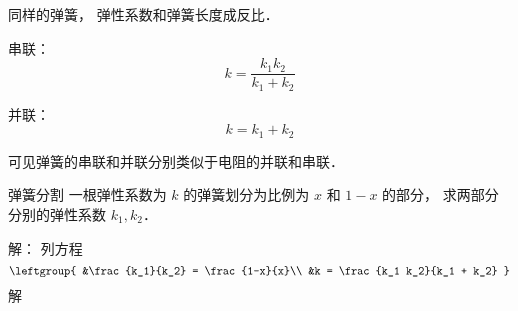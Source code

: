 
\begin{issues}
\issueDraft
\end{issues}

同样的弹簧， 弹性系数和弹簧长度成反比．

串联：
\begin{equation}
k = \frac{k_1 k_2}{k_1 + k_2}
\end{equation}

并联：
\begin{equation}
k = k_1 + k_2
\end{equation}

可见弹簧的串联和并联分别类似于电阻的并联和串联．


\begin{example}{弹簧分割}
一根弹性系数为 $k$ 的弹簧划分为比例为 $x$ 和 $1-x$ 的部分， 求两部分分别的弹性系数 $k_1, k_2$．

解： 列方程
\begin{equation}
\leftgroup{
&\frac{k_1}{k_2} = \frac{1-x}{x}\\
&k = \frac{k_1 k_2}{k_1 + k_2}
}
\end{equation}
解
\end{example}

